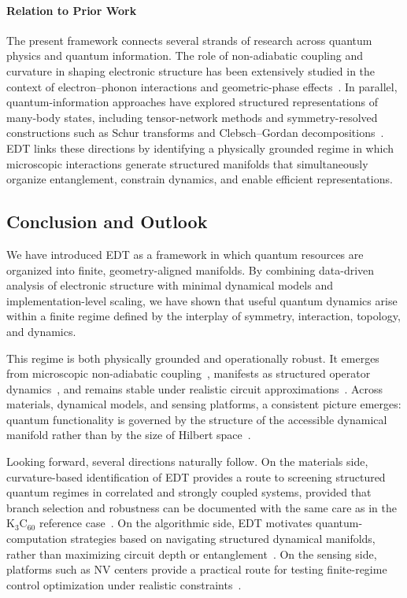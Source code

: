 \documentclass[twocolumn,10pt]{article}
\begin{document}
\paragraph*{Relation to Prior Work}

The present framework connects several strands of research across quantum physics and quantum information. The role of non-adiabatic coupling and curvature in shaping electronic structure has been extensively studied in the context of electron--phonon interactions and geometric-phase effects~\cite{Mead1979,Yarkony1996,Giustino2017}. In parallel, quantum-information approaches have explored structured representations of many-body states, including tensor-network methods and symmetry-resolved constructions such as Schur transforms and Clebsch--Gordan decompositions~\cite{Schollwock2011,Bacon2006}. EDT links these directions by identifying a physically grounded regime in which microscopic interactions generate structured manifolds that simultaneously organize entanglement, constrain dynamics, and enable efficient representations.

\subsection{Conclusion and Outlook}

We have introduced EDT as a framework in which quantum resources are organized into finite, geometry-aligned manifolds. By combining data-driven analysis of electronic structure with minimal dynamical models and implementation-level scaling, we have shown that useful quantum dynamics arise within a finite regime defined by the interplay of symmetry, interaction, topology, and dynamics.

This regime is both physically grounded and operationally robust. It emerges from microscopic non-adiabatic coupling~\cite{Mead1979,Yarkony1996}, manifests as structured operator dynamics~\cite{Swingle2018}, and remains stable under realistic circuit approximations~\cite{Lloyd1996,Childs2019}. Across materials, dynamical models, and sensing platforms, a consistent picture emerges: quantum functionality is governed by the structure of the accessible dynamical manifold rather than by the size of Hilbert space~\cite{Amico2008,Eisert2010}.

Looking forward, several directions naturally follow. On the materials side, curvature-based identification of EDT provides a route to screening structured quantum regimes in correlated and strongly coupled systems, provided that branch selection and robustness can be documented with the same care as in the K$_3$C$_{60}$ reference case~\cite{Capone2009}. On the algorithmic side, EDT motivates quantum-computation strategies based on navigating structured dynamical manifolds, rather than maximizing circuit depth or entanglement~\cite{Preskill2018}. On the sensing side, platforms such as NV centers provide a practical route for testing finite-regime control optimization under realistic constraints~\cite{Degen2017}.
\end{document}

